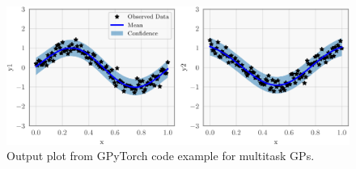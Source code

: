 \begin{figure}[ht!]
  \centering
  \includegraphics[width=\linewidth]{figures/example_gpytorch_plot_multitask.pdf}
  \caption{
    Output plot from GPyTorch code example for multitask GPs.
  }
  \label{fig:example_gpytorch_plot_multitask}
\end{figure}
